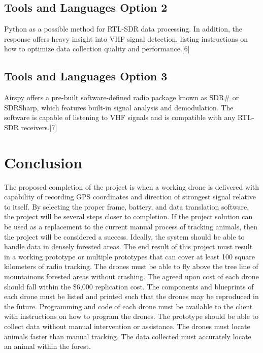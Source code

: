 \documentclass[onecolumn, draftclsnofoot,10pt, compsoc]{IEEEtran}
\begin{document}
\subsection{Tools and Languages Option 2}
Python as a possible method for RTL-SDR data processing. In addition, the response offers heavy insight into VHF signal detection, listing instructions on how to optimize data collection quality and performance.[6]
\subsection{Tools and Languages Option 3}
Airspy offers a pre-built software-defined radio package known as SDR\# or SDRSharp, which features built-in signal analysis and demodulation. The software is capable of listening to VHF signals and is compatible with any RTL-SDR receivers.[7]

\section{Conclusion}
The proposed completion of the project is when a working drone is delivered with capability of recording GPS coordinates and direction of strongest signal relative to itself. By selecting the proper frame, battery, and data translation software, the project will be several steps closer to completion. If the project solution can be used as a replacement to the current manual process of tracking animals, then the project will be considered a success. Ideally, the system should be able to handle data in densely forested areas. The end result of this project must result in a working prototype or multiple prototypes that can cover at least 100 square kilometers of radio tracking. The drones must be able to fly above the tree line of mountainous forested areas without crashing. The agreed upon cost of each drone should fall within the \$6,000 replication cost. The components and blueprints of each drone must be listed and printed such that the drones may be reproduced in the future. Programming and code of each drone must be available to the client with instructions on how to program the drones. The prototype should be able to collect data without manual intervention or assistance. The drones must locate animals faster than manual tracking. The data collected must accurately locate an animal within the forest. 

\nocite{*}

\end{document}
